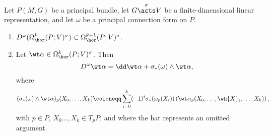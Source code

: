 \begin{prop}[{{\cite[Prop.~1.4.3]{RS2}}}]\label{prop 1.4.3 RS2}
    Let $P(M,G)$ be a principal bundle, let $G\overset{\sigma}{\acts}V$ be a finite-dimensional linear representation, and let $\omega$ be a principal connection form on $P$.
    \begin{enumerate}
        \item $D^\omega(\Omega^k_{\hor}(P;V)^\sigma)\subset \Omega^{k+1}_{\hor}(P;V)^\sigma$.
        \item Let $\wt\alpha\in\Omega^k_{\hor}(P;V)^\sigma$. Then
        \[D^\omega\wt\alpha=\dd\wt\alpha+\sigma_\ast(\omega)\wedge \wt\alpha,\label{eq 1.4.1 RS2}\]
        where
        \[(\sigma_\ast(\omega)\wedge\wt\alpha)_p(X_0,\ldots,X_k)\coloneqq \sum_{i=0}^k (-1)^i\sigma_\ast(\omega_p(X_i))\left(\wt\alpha_p(X_0,\ldots,\wh{X}_i,\ldots,X_k)\right),\]
        with $p\in P$, $X_0\ldots,X_k\in T_pP$, and where the hat represents an omitted argument.
    \end{enumerate}
\end{prop}
